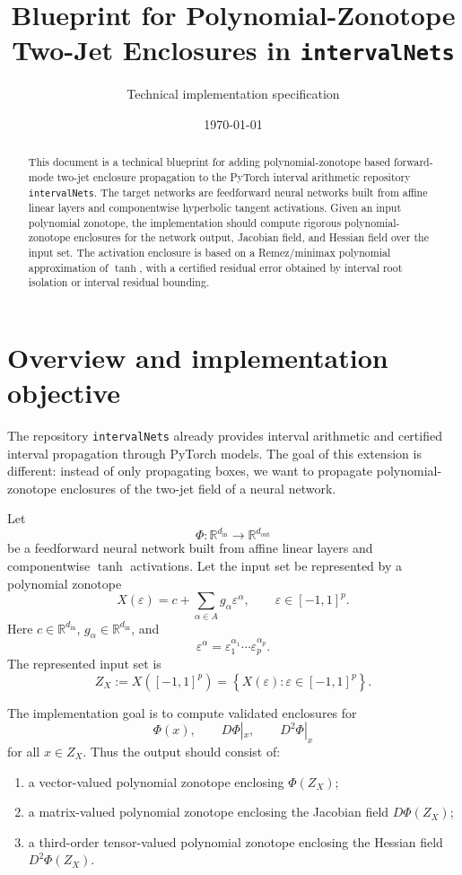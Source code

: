 \documentclass[11pt]{article}
\title{Blueprint for Polynomial-Zonotope Two-Jet Enclosures in \texttt{intervalNets}}
\author{Technical implementation specification}
\date{\today}
\newcommand{\R}{\mathbb{R}}
\newcommand{\eps}{\varepsilon}
\begin{document}
\maketitle

\begin{abstract}
This document is a technical blueprint for adding polynomial-zonotope based forward-mode two-jet enclosure propagation to the PyTorch interval arithmetic repository \texttt{intervalNets}. The target networks are feedforward neural networks built from affine linear layers and componentwise hyperbolic tangent activations. Given an input polynomial zonotope, the implementation should compute rigorous polynomial-zonotope enclosures for the network output, Jacobian field, and Hessian field over the input set. The activation enclosure is based on a Remez/minimax polynomial approximation of \(\tanh\), with a certified residual error obtained by interval root isolation or interval residual bounding.
\end{abstract}

\tableofcontents

\section{Overview and implementation objective}

The repository \texttt{intervalNets} already provides interval arithmetic and certified interval propagation through PyTorch models. The goal of this extension is different: instead of only propagating boxes, we want to propagate polynomial-zonotope enclosures of the two-jet field of a neural network.

Let
\[
    \Phi:\R^{d_{\mathrm{in}}}\to\R^{d_{\mathrm{out}}}
\]
be a feedforward neural network built from affine linear layers and componentwise \(\tanh\) activations. Let the input set be represented by a polynomial zonotope
\[
    X(\eps)
    =
    c+\sum_{\alpha\in A}g_\alpha\eps^\alpha,
    \qquad
    \eps\in[-1,1]^p.
\]
Here \(c\in\R^{d_{\mathrm{in}}}\), \(g_\alpha\in\R^{d_{\mathrm{in}}}\), and
\[
    \eps^\alpha
    =
    \eps_1^{\alpha_1}\cdots\eps_p^{\alpha_p}.
\]
The represented input set is
\[
    Z_X
    :=
    X([-1,1]^p)
    =
    \left\{X(\eps):\eps\in[-1,1]^p\right\}.
\]

The implementation goal is to compute validated enclosures for
\[
    \Phi(x),
    \qquad
    D\Phi|_x,
    \qquad
    D^2\Phi|_x
\]
for all \(x\in Z_X\). Thus the output should consist of:
\begin{enumerate}[label=(\roman*)]
    \item a vector-valued polynomial zonotope enclosing \(\Phi(Z_X)\);
    \item a matrix-valued polynomial zonotope enclosing the Jacobian field \(D\Phi(Z_X)\);
    \item a third-order tensor-valued polynomial zonotope enclosing the Hessian field \(D^2\Phi(Z_X)\).
\end{enumerate}
\end{document}
